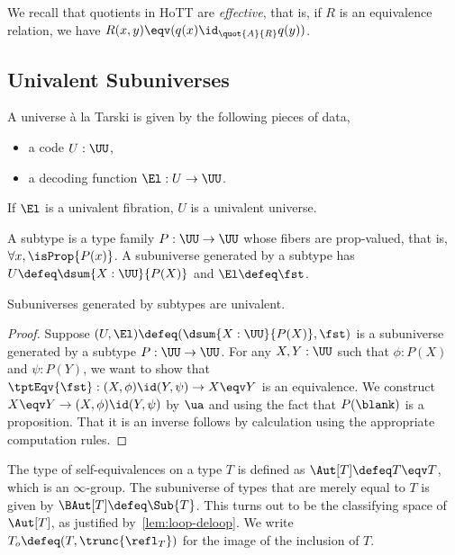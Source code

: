 We recall that quotients in HoTT are \emph{effective}, that is, if $R$ is an equivalence relation, we have
$R(x,y) \eqv (q(x) \id_{\quot{A}{R}} q(y))$.

\subsection{Univalent Subuniverses}


\begin{definition}[Universe]
  A universe \`{a} la Tarski is given by the following pieces of data,
  \begin{itemize}
    \item a code $U : \UU$,
    \item a decoding function $\El : U \to \UU$.
  \end{itemize}
  If $\El$ is a univalent fibration, $U$ is a univalent universe.
\end{definition}

\begin{definition}[Subuniverse]
  A subtype is a type family $P : \UU \to \UU$ whose fibers are prop-valued, that is, $\forall x, \isProp{P(x)}$. A
  subuniverse generated by a subtype has $U \defeq \dsum{X:\UU}{P(X)}$ and $\El \defeq \fst$.
\end{definition}

\begin{proposition}
  Subuniverses generated by subtypes are univalent.
\end{proposition}

\begin{proof}
  Suppose $(U, \El) \defeq (\dsum{X:\UU}{P(X)}, \fst)$ is a subuniverse generated by a subtype $P : \UU \to \UU$. For
  any $X, Y : \UU$ such that $\phi : P(X)$ and $\psi : P(Y)$, we want to show that
  $\tptEqv{\fst} : (X,\phi) \id (Y,\psi) \to X \eqv Y$ is an equivalence. We construct
  $X \eqv Y \to (X,\phi) \id (Y,\psi)$ by $\ua$ and using the fact that $P(\blank)$ is a proposition. That it is an
  inverse follows by calculation using the appropriate computation rules.
\end{proof}

\begin{example}[$\BAut$]
  The type of self-equivalences on a type $T$ is defined as $\Aut[T] \defeq T \eqv T$, which is an $\infty$-group. The
  subuniverse of types that are merely equal to $T$ is given by $\BAut[T] \defeq \Sub{T}$. This turns out to be the
  classifying space of $\Aut[T]$, as justified by~\cref{lem:loop-deloop}. We write $T_{o} \defeq (T, \trunc{\refl_{T}})$
  for the image of the inclusion of $T$.
\end{example}

